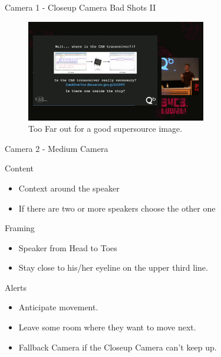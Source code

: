 \documentclass[aspectratio=169]{beamer}
\begin{document}
\begin{frame}{Camera 1 - Closeup Camera}
	Bad Shots II
	\begin{figure} 
		\centering
		\includegraphics[width=0.7\textwidth]{images/closeup-bad2.png}
		\caption{Too Far out for a good supersource image.}
	\end{figure}
\end{frame}


\begin{frame}{Camera 2 - Medium Camera}
		\begin{block}{Content}
			\begin{itemize}
				\item Context around the speaker
				\item If there are two or more speakers choose the other one
			\end{itemize}
		\end{block}
		
		\begin{block}{Framing}
			\begin{itemize}
				\item Speaker from Head to Toes
				\item Stay close to his/her eyeline on the upper third line.
			\end{itemize}
		\end{block}

		\begin{alertblock}{Alerts}
			\begin{itemize}
				\item Anticipate movement.
				\item Leave some room where they want to move next.
				\item Fallback Camera if the Closeup Camera can't keep up.
			\end{itemize}
		\end{alertblock}
\end{frame}
\end{document}

